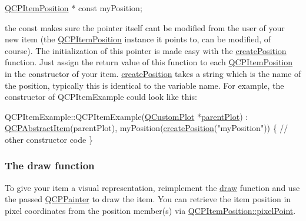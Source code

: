 \begin{DoxyCode}
\hyperlink{class_q_c_p_item_position}{QCPItemPosition} * \textcolor{keyword}{const} myPosition;
\end{DoxyCode}


the const makes sure the pointer itself can\textquotesingle{}t be modified from the user of your new item (the \hyperlink{class_q_c_p_item_position}{Q\+C\+P\+Item\+Position} instance it points to, can be modified, of course). The initialization of this pointer is made easy with the \hyperlink{class_q_c_p_abstract_item_a75036d39c4d4e2e1a7dd145fff915d32}{create\+Position} function. Just assign the return value of this function to each \hyperlink{class_q_c_p_item_position}{Q\+C\+P\+Item\+Position} in the constructor of your item. \hyperlink{class_q_c_p_abstract_item_a75036d39c4d4e2e1a7dd145fff915d32}{create\+Position} takes a string which is the name of the position, typically this is identical to the variable name. For example, the constructor of Q\+C\+P\+Item\+Example could look like this\+:


\begin{DoxyCode}
QCPItemExample::QCPItemExample(\hyperlink{class_q_custom_plot}{QCustomPlot} *\hyperlink{class_q_c_p_layerable_ab7e0e94461566093d36ffc0f5312b109}{parentPlot}) :
  \hyperlink{class_q_c_p_abstract_item}{QCPAbstractItem}(parentPlot),
  myPosition(\hyperlink{class_q_c_p_abstract_item_a75036d39c4d4e2e1a7dd145fff915d32}{createPosition}(\textcolor{stringliteral}{"myPosition"}))
\{
  \textcolor{comment}{// other constructor code}
\}
\end{DoxyCode}
\hypertarget{class_q_c_p_abstract_item_items-drawing}{}\subsubsection{The draw function}\label{class_q_c_p_abstract_item_items-drawing}
To give your item a visual representation, reimplement the \hyperlink{class_q_c_p_abstract_item_ad0dc056f650c3ca73414e6b4f01674ef}{draw} function and use the passed \hyperlink{class_q_c_p_painter}{Q\+C\+P\+Painter} to draw the item. You can retrieve the item position in pixel coordinates from the position member(s) via \hyperlink{class_q_c_p_item_position_ae490f9c76ee2ba33752c495d3b6e8fb5}{Q\+C\+P\+Item\+Position\+::pixel\+Point}.

